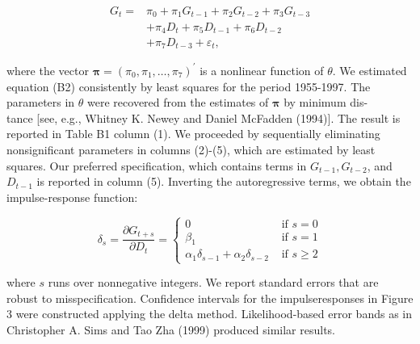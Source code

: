 \documentclass[10pt]{article}
\begin{document}
$$
\begin{aligned}
G_{t}= & \pi_{0}+\pi_{1} G_{t-1}+\pi_{2} G_{t-2}+\pi_{3} G_{t-3} \\
& +\pi_{4} D_{t}+\pi_{5} D_{t-1}+\pi_{6} D_{t-2} \\
& +\pi_{7} D_{t-3}+\varepsilon_{t},
\end{aligned}
$$

where the vector $\boldsymbol{\pi}=\left(\pi_{0}, \pi_{1}, \ldots, \pi_{7}\right)^{\prime}$ is a nonlinear function of $\theta$. We estimated equation (B2) consistently by least squares for the period 1955-1997. The parameters in $\theta$ were recovered from the estimates of $\boldsymbol{\pi}$ by minimum dis-\\[0pt]
tance [see, e.g., Whitney K. Newey and Daniel McFadden (1994)]. The result is reported in Table B1 column (1). We proceeded by sequentially eliminating nonsignificant parameters in columns (2)-(5), which are estimated by least squares. Our preferred specification, which contains terms in $G_{t-1}, G_{t-2}$, and $D_{t-1}$ is reported in column (5). Inverting the autoregressive terms, we obtain the impulse-response function:

$$
\delta_{s}=\frac{\partial G_{t+s}}{\partial D_{t}}=\left\{\begin{array}{cc}
0 & \text { if } s=0 \\
\beta_{1} & \text { if } s=1 \\
\alpha_{1} \delta_{s-1}+\alpha_{2} \delta_{s-2} & \text { if } s \geq 2
\end{array}\right.
$$

where $s$ runs over nonnegative integers. We report standard errors that are robust to misspecification. Confidence intervals for the impulseresponses in Figure 3 were constructed applying the delta method. Likelihood-based error bands as in Christopher A. Sims and Tao Zha (1999) produced similar results.
\end{document}
